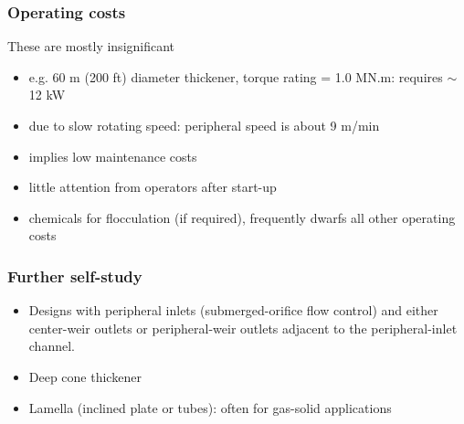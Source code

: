 \begin{frame}\frametitle{Operating costs}
	These are mostly insignificant
	\begin{itemize}
		\item	e.g. 60 m (200 ft) diameter thickener, torque rating = 1.0 MN.m: requires $\sim$ 12 kW
		\item	due to slow rotating speed: peripheral speed is about 9 m/min
		\item	implies low maintenance costs
		\item	little attention from operators after start-up
		\item	chemicals for flocculation (if required), frequently dwarfs all other operating costs 
	\end{itemize}
\end{frame}

\begin{frame}\frametitle{Further self-study}
	\begin{itemize}
		\item	Designs with peripheral inlets (submerged-orifice flow control) and either center-weir outlets or peripheral-weir outlets adjacent to the peripheral-inlet channel.
		\item	Deep cone thickener
		\item	Lamella (inclined plate or tubes): often for gas-solid applications
	\end{itemize}
\end{frame}


